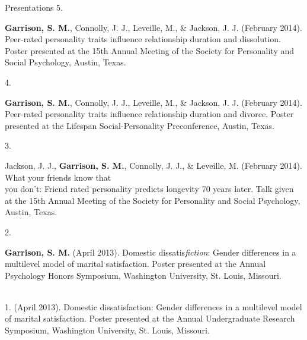 \documentclass {resume}
\begin{document}
\begin{rSection}{\textrm{Presentations}}
5.\hspace* {2.5 mm}\begin{samepage}{\bf Garrison, S. M.}, Connolly, J. J., Leveille, M., \& Jackson, J. J. (February 2014). Peer-rated personality traits \hspace* {6 mm}influence relationship duration and dissolution. Poster presented at the 15th Annual Meeting of the Society for \hspace* {6 mm}Personality and Social Psychology, Austin, Texas.\smallskip\\\end{samepage}
4.\hspace* {2.5 mm}\begin{samepage}{\bf Garrison, S. M.}, Connolly, J. J., Leveille, M., \& Jackson, J. J. (February 2014). Peer-rated personality traits \hspace* {6 mm}influence relationship duration and divorce. Poster presented at the Lifespan Social-Personality Preconference, \hspace* {6 mm}Austin, Texas.\smallskip\\\end{samepage}
3.\hspace* {2.5 mm}\begin{samepage}Jackson, J. J., \textbf{Garrison, S. M.}, Connolly, J. J., \& Leveille, M. (February 2014). What your friends know that\\ 
\hspace* {6 mm}you don't: Friend rated personality predicts longevity 70 years later. Talk given at the 15th Annual Meeting \hspace* {6 mm}of the Society for Personality and  Social Psychology, Austin, Texas. \smallskip\\\end{samepage}
2.\hspace* {2.5 mm}\begin{samepage}{\bf Garrison, S. M.} (April 2013). Domestic dissatis{\em fiction}: Gender differences in a multilevel model of marital \hspace* {6 mm}satisfaction. Poster presented at the Annual Psychology Honors Symposium, Washington  University, St. Louis, \hspace* {6 mm}Missouri.\end{samepage}\smallskip\\
1.\hspace* {2.5 mm}{\bf Garrison, S. M.} (April 2013). Domestic dissatisfaction: Gender differences in a multilevel model of marital \hspace* {6 mm}satisfaction. Poster presented at the Annual Undergraduate Research Symposium, Washington University, St. \hspace* {6 mm}Louis, Missouri.
\end{rSection}
\end{document}
